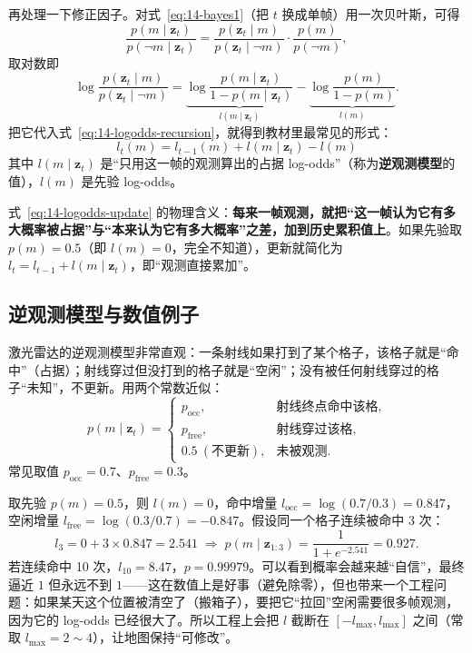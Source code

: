 再处理一下修正因子。对式~\eqref{eq:14-bayes1}（把 $t$ 换成单帧）用一次贝叶斯，可得
\begin{equation}
\frac{p(m\mid\bm{z}_t)}{p(\neg m\mid\bm{z}_t)}
=\frac{p(\bm{z}_t\mid m)}{p(\bm{z}_t\mid\neg m)}\cdot\frac{p(m)}{p(\neg m)},
\end{equation}
取对数即
\begin{equation}
\log\frac{p(\bm{z}_t\mid m)}{p(\bm{z}_t\mid\neg m)}
=\underbrace{\log\frac{p(m\mid\bm{z}_t)}{1-p(m\mid\bm{z}_t)}}_{l(m\mid\bm{z}_t)}
-\underbrace{\log\frac{p(m)}{1-p(m)}}_{l(m)}.
\end{equation}
把它代入式~\eqref{eq:14-logodds-recursion}，就得到教材里最常见的形式：
\begin{equation}
\boxed{\,l_t(m)=l_{t-1}(m)+l(m\mid\bm{z}_t)-l(m)\,}
\label{eq:14-logodds-update}
\end{equation}
其中 $l(m\mid\bm{z}_t)$ 是``只用这一帧的观测算出的占据 log-odds''（称为\textbf{逆观测模型}的值），$l(m)$ 是先验 log-odds。

式~\eqref{eq:14-logodds-update} 的物理含义：\textbf{每来一帧观测，就把``这一帧认为它有多大概率被占据''与``本来认为它有多大概率''之差，加到历史累积值上}。如果先验取 $p(m)=0.5$（即 $l(m)=0$，完全不知道），更新就简化为 $l_t=l_{t-1}+l(m\mid\bm{z}_t)$，即``观测直接累加''。

\subsection{逆观测模型与数值例子}

激光雷达的逆观测模型非常直观：一条射线如果打到了某个格子，该格子就是``命中''（占据）；射线穿过但没打到的格子就是``空闲''；没有被任何射线穿过的格子``未知''，不更新。用两个常数近似：
\begin{equation}
p(m\mid\bm{z}_t)=\begin{cases}
p_{\mathrm{occ}}, & \text{射线终点命中该格},\\
p_{\mathrm{free}}, & \text{射线穿过该格},\\
0.5\ (\text{不更新}), & \text{未被观测}.
\end{cases}
\end{equation}
常见取值 $p_{\mathrm{occ}}=0.7$、$p_{\mathrm{free}}=0.3$。

\begin{example}[三帧观测把概率推到多少]
取先验 $p(m)=0.5$，则 $l(m)=0$，命中增量 $l_{\mathrm{occ}}=\log(0.7/0.3)=0.847$，空闲增量 $l_{\mathrm{free}}=\log(0.3/0.7)=-0.847$。假设同一个格子连续被命中 3 次：
\begin{equation}
l_3=0+3\times0.847=2.541
\;\Longrightarrow\;
p(m\mid\bm{z}_{1:3})=\frac{1}{1+e^{-2.541}}=0.927 .
\end{equation}
若连续命中 10 次，$l_{10}=8.47$，$p=0.99979$。可以看到概率会越来越``自信''，最终逼近 $1$ 但永远不到 $1$——这在数值上是好事（避免除零），但也带来一个工程问题：如果某天这个位置被清空了（搬箱子），要把它``拉回''空闲需要很多帧观测，因为它的 log-odds 已经很大了。所以工程上会把 $l$ 截断在 $[-l_{\max},l_{\max}]$ 之间（常取 $l_{\max}=2\sim4$），让地图保持``可修改''。
\end{example}

